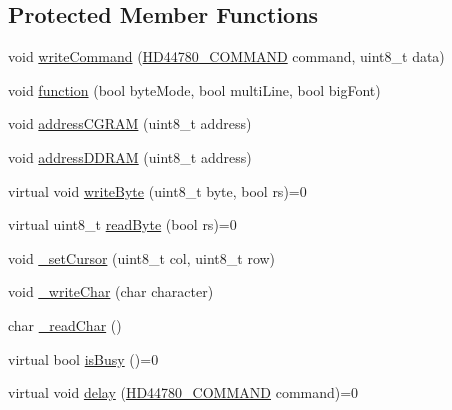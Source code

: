 \subsection*{Protected Member Functions}
\begin{DoxyCompactItemize}
\item 
void \hyperlink{classmhvlib_1_1_display___h_d44780_a67637859517965612b1df3d70bc9924b}{write\-Command} (\hyperlink{namespacemhvlib_a810a3cc703298cdd5d00c913cb1bfec9}{H\-D44780\-\_\-\-C\-O\-M\-M\-A\-N\-D} command, uint8\-\_\-t data)
\item 
void \hyperlink{classmhvlib_1_1_display___h_d44780_aa79b044992f0f0d923a6aa1c018a7530}{function} (bool byte\-Mode, bool multi\-Line, bool big\-Font)
\item 
void \hyperlink{classmhvlib_1_1_display___h_d44780_aa4459af77facd485c414285c449466de}{address\-C\-G\-R\-A\-M} (uint8\-\_\-t address)
\item 
void \hyperlink{classmhvlib_1_1_display___h_d44780_a7cb27b4321f535163ff96297c01a31b9}{address\-D\-D\-R\-A\-M} (uint8\-\_\-t address)
\item 
virtual void \hyperlink{classmhvlib_1_1_display___h_d44780_a1d20c6cdaee32775805dcf8ec7dabbbf}{write\-Byte} (uint8\-\_\-t byte, bool rs)=0
\item 
virtual uint8\-\_\-t \hyperlink{classmhvlib_1_1_display___h_d44780_a20390768822b144aec6a3736d252a824}{read\-Byte} (bool rs)=0
\item 
void \hyperlink{classmhvlib_1_1_display___h_d44780_a20a5006af33d5e62e08484102cf0b875}{\-\_\-set\-Cursor} (uint8\-\_\-t col, uint8\-\_\-t row)
\item 
void \hyperlink{classmhvlib_1_1_display___h_d44780_a86e0155089fa7d2d09bae44e6b7cab79}{\-\_\-write\-Char} (char character)
\item 
char \hyperlink{classmhvlib_1_1_display___h_d44780_a49bddf9b4c387f59aaaac6026e27373d}{\-\_\-read\-Char} ()
\item 
virtual bool \hyperlink{classmhvlib_1_1_display___h_d44780_a9b5d66702c6be04794d9788257518a47}{is\-Busy} ()=0
\item 
virtual void \hyperlink{classmhvlib_1_1_display___h_d44780_a9280b292432c96c67a8ce4b848c8c097}{delay} (\hyperlink{namespacemhvlib_a810a3cc703298cdd5d00c913cb1bfec9}{H\-D44780\-\_\-\-C\-O\-M\-M\-A\-N\-D} command)=0
\end{DoxyCompactItemize}
